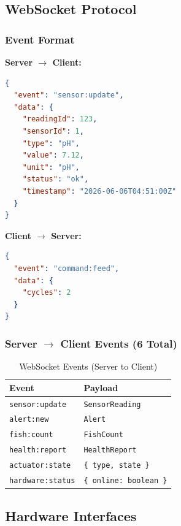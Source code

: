 \documentclass[12pt,a4paper,oneside]{article}
\begin{document}
\subsection{WebSocket Protocol}

\subsubsection{Event Format}
\textbf{Server $\rightarrow$ Client:}
\begin{lstlisting}[language=JSON]
{
  "event": "sensor:update",
  "data": {
    "readingId": 123,
    "sensorId": 1,
    "type": "pH",
    "value": 7.12,
    "unit": "pH",
    "status": "ok",
    "timestamp": "2026-06-06T04:51:00Z"
  }
}
\end{lstlisting}

\textbf{Client $\rightarrow$ Server:}
\begin{lstlisting}[language=JSON]
{
  "event": "command:feed",
  "data": {
    "cycles": 2
  }
}
\end{lstlisting}

\subsubsection{Server $\rightarrow$ Client Events (6 Total)}
\begin{table}[H]
    \centering
    \begin{tabularx}{\textwidth}{lX}
        \toprule
        \textbf{Event} & \textbf{Payload} \\
        \midrule
        \texttt{sensor:update} & \texttt{SensorReading} \\
        \texttt{alert:new} & \texttt{Alert} \\
        \texttt{fish:count} & \texttt{FishCount} \\
        \texttt{health:report} & \texttt{HealthReport} \\
        \texttt{actuator:state} & \texttt{\{ type, state \}} \\
        \texttt{hardware:status} & \texttt{\{ online: boolean \}} \\
        \bottomrule
    \end{tabularx}
    \caption{WebSocket Events (Server to Client)}
\end{table}

\subsection{Hardware Interfaces}
\end{document}
